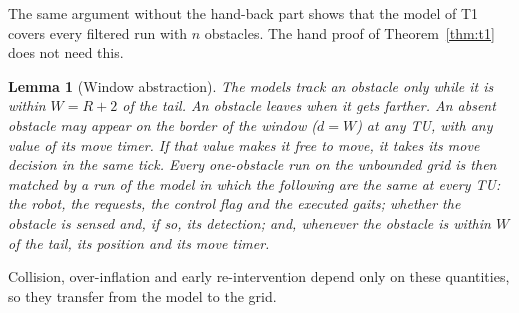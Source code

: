 \documentclass[11pt,a4paper]{article}
\newtheorem{lemma}{Lemma}
\theoremstyle{definition}
\newcommand{\tu}{TU}
\begin{document}
The same argument without the hand-back part shows that the model of T1 covers every filtered run with $n$ obstacles. The hand proof of Theorem~\ref{thm:t1} does not need this.

\begin{lemma}[Window abstraction]\label{lem:window}
The models track an obstacle only while it is within $W=R+2$ of the tail. An obstacle leaves when it gets farther. An absent obstacle may appear on the border of the window ($d=W$) at any \tu, with any value of its move timer. If that value makes it free to move, it takes its move decision in the same tick. Every one-obstacle run on the unbounded grid is then matched by a run of the model in which the following are the same at every \tu: the robot, the requests, the control flag and the executed gaits; whether the obstacle is sensed and, if so, its detection; and, whenever the obstacle is within $W$ of the tail, its position and its move timer.
\end{lemma}

Collision, over-inflation and early re-intervention depend only on these quantities, so they transfer from the model to the grid.
\end{document}
